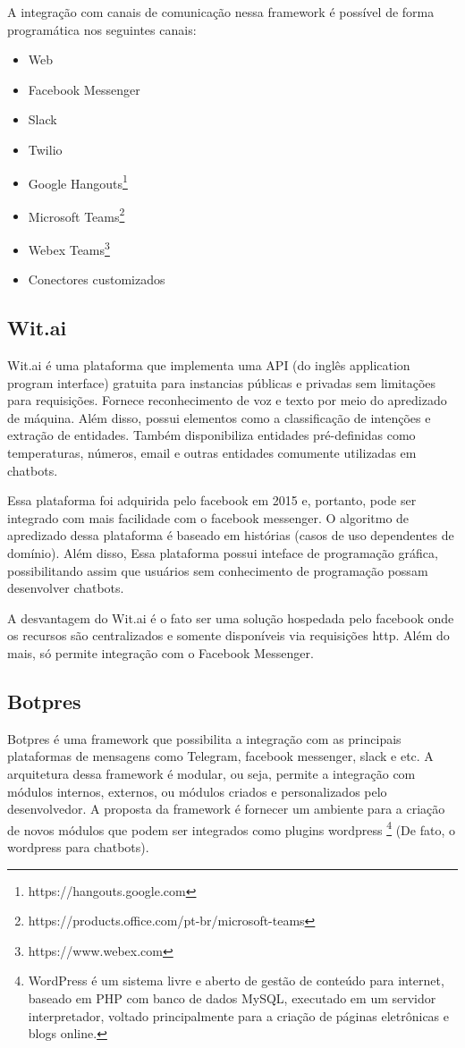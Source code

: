 A integração com canais de comunicação nessa framework é possível de forma programática nos seguintes canais:

\begin{itemize}
    \item Web
    \item Facebook Messenger
    \item Slack
    \item Twilio
    \item Google Hangouts\footnote{https://hangouts.google.com}
    \item Microsoft Teams\footnote{https://products.office.com/pt-br/microsoft-teams}
    \item Webex Teams\footnote{https://www.webex.com}
    \item Conectores customizados
\end{itemize}



\subsection{Wit.ai}

Wit.ai é uma plataforma que implementa uma API (do inglês application program interface) gratuita para instancias públicas e privadas sem limitações para requisições. Fornece reconhecimento de voz e texto por meio do apredizado de máquina. Além disso, possui elementos como a classificação de intenções e extração de entidades. Também disponibiliza entidades pré-definidas como temperaturas, números, email e outras entidades comumente utilizadas em chatbots.

Essa plataforma foi adquirida pelo facebook em 2015 e, portanto, pode ser integrado com mais facilidade com o facebook messenger. O algoritmo de apredizado dessa plataforma é baseado em histórias (casos de uso dependentes de domínio). Além disso, Essa plataforma possui inteface de programação gráfica, possibilitando assim que usuários sem conhecimento de programação possam desenvolver chatbots. 

A desvantagem do Wit.ai é o fato ser uma solução hospedada pelo facebook onde os recursos são centralizados e somente disponíveis via requisições http. Além do mais, só permite integração com o Facebook Messenger.


\subsection{Botpres}
Botpres é uma framework que possibilita a integração com as principais plataformas de mensagens como Telegram, facebook messenger, slack e etc. A arquitetura dessa framework é modular, ou seja, permite a integração com módulos internos, externos, ou módulos criados e personalizados pelo desenvolvedor. A proposta da framework é fornecer um ambiente para a criação de novos módulos que podem ser integrados como plugins wordpress \footnote{WordPress é um sistema livre e aberto de gestão de conteúdo para internet, baseado em PHP com banco de dados MySQL, executado em um servidor interpretador, voltado principalmente para a criação de páginas eletrônicas e blogs online.} (De fato, o wordpress para chatbots).

